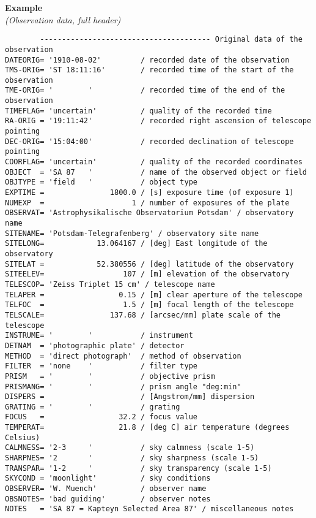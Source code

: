 \documentclass[11pt]{ivoa}
\newenvironment{fitsexample}[1]
{\bigskip\noindent\textbf{Example}\\\textit{(#1\smallskip)}}
{\medskip}
\begin{document}
\begin{fitsexample}{Observation data, full header}
\begin{lstlisting}
        --------------------------------------- Original data of the observation
DATEORIG= '1910-08-02'         / recorded date of the observation
TMS-ORIG= 'ST 18:11:16'        / recorded time of the start of the observation
TME-ORIG= '        '           / recorded time of the end of the observation
TIMEFLAG= 'uncertain'          / quality of the recorded time
RA-ORIG = '19:11:42'           / recorded right ascension of telescope pointing
DEC-ORIG= '15:04:00'           / recorded declination of telescope pointing
COORFLAG= 'uncertain'          / quality of the recorded coordinates
OBJECT  = 'SA 87   '           / name of the observed object or field
OBJTYPE = 'field   '           / object type
EXPTIME =               1800.0 / [s] exposure time (of exposure 1)
NUMEXP  =                    1 / number of exposures of the plate
OBSERVAT= 'Astrophysikalische Observatorium Potsdam' / observatory name
SITENAME= 'Potsdam-Telegrafenberg' / observatory site name
SITELONG=            13.064167 / [deg] East longitude of the observatory
SITELAT =            52.380556 / [deg] latitude of the observatory
SITEELEV=                  107 / [m] elevation of the observatory
TELESCOP= 'Zeiss Triplet 15 cm' / telescope name
TELAPER =                 0.15 / [m] clear aperture of the telescope
TELFOC  =                  1.5 / [m] focal length of the telescope
TELSCALE=               137.68 / [arcsec/mm] plate scale of the telescope
INSTRUME= '        '           / instrument
DETNAM  = 'photographic plate' / detector
METHOD  = 'direct photograph'  / method of observation
FILTER  = 'none    '           / filter type
PRISM   = '        '           / objective prism
PRISMANG= '        '           / prism angle "deg:min"
DISPERS =                      / [Angstrom/mm] dispersion
GRATING = '        '           / grating
FOCUS   =                 32.2 / focus value
TEMPERAT=                 21.8 / [deg C] air temperature (degrees Celsius)
CALMNESS= '2-3     '           / sky calmness (scale 1-5)
SHARPNES= '2       '           / sky sharpness (scale 1-5)
TRANSPAR= '1-2     '           / sky transparency (scale 1-5)
SKYCOND = 'moonlight'          / sky conditions
OBSERVER= 'W. Muench'          / observer name
OBSNOTES= 'bad guiding'        / observer notes
NOTES   = 'SA 87 = Kapteyn Selected Area 87' / miscellaneous notes
\end{lstlisting}
\end{fitsexample}
\end{document}
